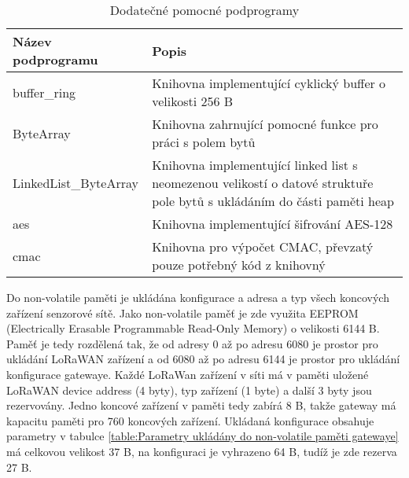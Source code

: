 \begin{table}[!h]
    \centering
    \begin{ctucolortab}
            \begin{tabular}{ |l|p{8cm}| }
     \hline

     Název podprogramu  & Popis           \\ \hline \hline

    buffer\_ring            & Knihovna implementující cyklický buffer o velikosti 256 B   \\ \hline
    ByteArray               & Knihovna zahrnující pomocné funkce pro práci s polem bytů       \\ \hline
    LinkedList\_ByteArray   & Knihovna implementující linked list s neomezenou velikostí o datové struktuře pole bytů s ukládáním do části paměti heap    \\ \hline
    aes                     & Knihovna implementující šifrování AES-128 \cite{lib_tiny-AES128-C}                \\ \hline
    cmac                    & Knihovna pro výpočet CMAC, převzatý pouze potřebný kód z knihovný \cite{lib_openpana}       \\ \hline

    \end{tabular}
    \end{ctucolortab}
    \caption{Dodatečné pomocné podprogramy}
    \label{table:sw_div}
\end{table}


Do non-volatile paměti je ukládána konfigurace a adresa a typ všech koncových zařízení senzorové sítě.
Jako non-volatile paměť je zde využita EEPROM (Electrically Erasable Programmable Read-Only Memory) o velikosti 6144 B. 
Paměť je tedy rozdělená tak, že od adresy 0 až po adresu 6080 je prostor pro ukládání LoRaWAN zařízení a od 6080 až po adresu 6144 je prostor pro ukládání konfigurace gatewaye.
Každé LoRaWan zařízení v síti má v paměti uložené LoRaWAN device address (4 byty), typ zařízení (1 byte) a další 3 byty jsou rezervovány. 
Jedno koncové zařízení v paměti tedy zabírá  8 B, takže gateway má kapacitu paměti pro 760 koncových zařízení.
Ukládaná konfigurace obsahuje parametry v tabulce \ref{table:Parametry ukládány do non-volatile paměti gatewaye} má celkovou velikost 37 B, na konfiguraci je vyhrazeno 64 B, tudíž je zde rezerva 27 B.

